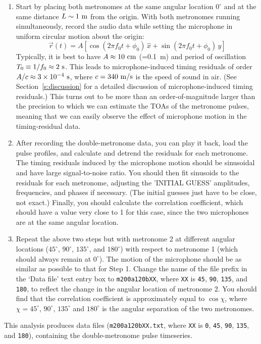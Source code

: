 \documentclass[10pt]{NSF}
\def\be{\begin{equation}}
\def\ee{\end{equation}}
\def\ben{\begin{enumerate}}
\def\een{\end{enumerate}}
\def\i{\item{}}
\begin{document}
\ben

\i Start by placing both metronomes at the same angular location $0^\circ$
and at the same distance $L\sim 1~{\rm m}$ from the origin.
With both metronomes running simultaneously, record the audio data
while setting the microphone in uniform circular motion 
about the origin:
%
\be
\vec r(t) 
= A\left[\cos(2\pi f_0 t + \phi_0)\, \hat x + \sin(2\pi f_0 t+\phi_0)\, \hat y\right]
\label{e:UCM}
\ee
%
Typically, it is best to have 
$A\approx 10~{\rm cm}$ (=0.1~m) and period of oscillation 
$T_0\equiv 1/f_0\approx 2~{\rm s}$.
This leads to microphone-induced timing residuals of order 
$A/c\approx 3\times 10^{-4}~{\rm s}$, where 
$c=340~{\rm m/s}$ is the
speed of sound in air.
(See Section~\ref{s:discussion} for a detailed discussion
of microphone-induced timing residuals.)
This turns out to be more than an order-of-magnitude larger than
the precision to which we can estimate the TOAs
of the metronome pulses, meaning that we can easily observe the
effect of microphone motion in the timing-residual data.

\i After recording the double-metronome data, you can play it back, 
load the pulse profiles, and calculate and detrend the residuals 
for each metronome.
The timing residuals induced by the microphone motion should be
sinusoidal and have large signal-to-noise ratio.
You should then fit sinusoids to the residuals for each metronome, 
adjusting the 'INITIAL GUESS' amplitudes, frequencies, and phases if 
necessary.  
(The initial guesses just have to be close, not exact.)
Finally, you should calculate the correlation coefficient, 
which should have a value very close to 1 for this case, since 
the two microphones are at the same angular location.

\i Repeat the above two steps but with metronome 2 at different
angular locations ($45^\circ$, $90^\circ$, $135^\circ$, and $180^\circ$)
with respect to metronome 1 (which should always remain at $0^\circ$).
The motion of the microphone should be as similar as possible to that
for Step 1.
Change the name of the file prefix in the 
`Data file' text entry box to {\tt m200a120bXX}, 
where {\tt XX} is {\tt 45}, {\tt 90}, {\tt 135}, and {\tt 180}, 
to reflect the change in the angular
location of metronome 2.
You should find that the correlation coefficient is approximately
equal to $\cos\chi$, where $\chi=45^\circ$, $90^\circ$, $135^\circ$ and $180^\circ$
is the angular separation of the two metronomes.

\een

This analysis produces data files ({\tt m200a120bXX.txt}, 
where {\tt XX} is {\tt 0}, {\tt 45}, {\tt 90}, {\tt 135}, and {\tt 180}),
containing the double-metronome pulse timeseries.
\end{document}
